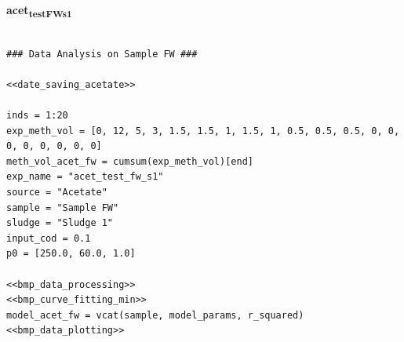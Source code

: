 \documentclass[11pt]{article}
\begin{document}
\textbf{acet\textsubscript{test}\textsubscript{FW}\textsubscript{s1}}
\begin{verbatim}

### Data Analysis on Sample FW ###

<<date_saving_acetate>>

inds = 1:20
exp_meth_vol = [0, 12, 5, 3, 1.5, 1.5, 1, 1.5, 1, 0.5, 0.5, 0.5, 0, 0, 0, 0, 0, 0, 0, 0]
meth_vol_acet_fw = cumsum(exp_meth_vol)[end]
exp_name = "acet_test_fw_s1"
source = "Acetate"
sample = "Sample FW"
sludge = "Sludge 1"
input_cod = 0.1
p0 = [250.0, 60.0, 1.0]

<<bmp_data_processing>>
<<bmp_curve_fitting_min>>
model_acet_fw = vcat(sample, model_params, r_squared)
<<bmp_data_plotting>>
\end{verbatim}
\end{document}
